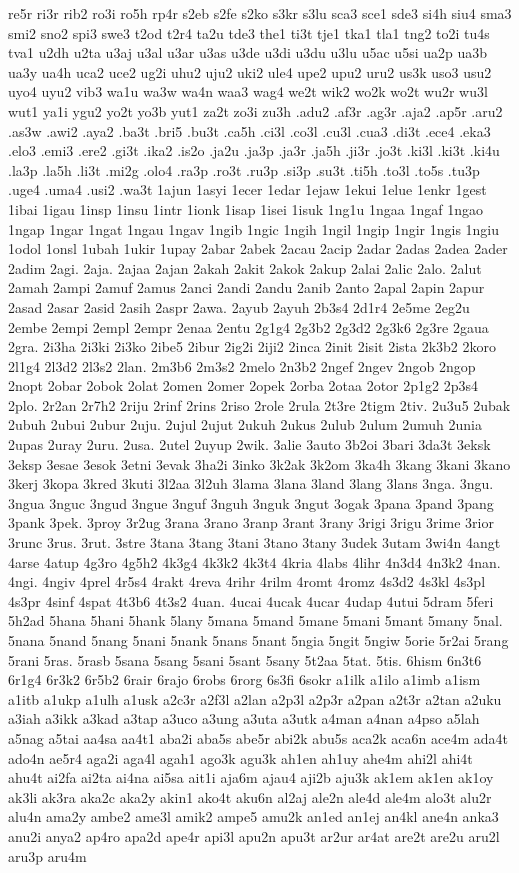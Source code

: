 {re5r ri3r rib2 ro3i ro5h rp4r s2eb s2fe s2ko s3kr s3lu sca3 sce1 sde3 si4h siu4 sma3 smi2 sno2 spi3 swe3 t2od t2r4 ta2u tde3 the1 ti3t tje1 tka1 tla1 tng2 to2i tu4s tva1 u2dh u2ta u3aj u3al u3ar u3as u3de u3di u3du u3lu u5ac u5si ua2p ua3b ua3y ua4h uca2 uce2 ug2i uhu2 uju2 uki2 ule4 upe2 upu2 uru2 us3k uso3 usu2 uyo4 uyu2 vib3 wa1u wa3w wa4n waa3 wag4 we2t wik2 wo2k wo2t wu2r wu3l wut1 ya1i ygu2 yo2t yo3b yut1 za2t zo3i zu3h
.adu2 .af3r .ag3r .aja2 .ap5r .aru2 .as3w .awi2 .aya2 .ba3t .bri5 .bu3t .ca5h .ci3l .co3l .cu3l .cua3 .di3t .ece4 .eka3 .elo3 .emi3 .ere2 .gi3t .ika2 .is2o .ja2u .ja3p .ja3r .ja5h .ji3r .jo3t .ki3l .ki3t .ki4u .la3p .la5h .li3t .mi2g .olo4 .ra3p .ro3t .ru3p .si3p .su3t .ti5h .to3l .to5s .tu3p .uge4 .uma4 .usi2 .wa3t 1ajun 1asyi 1ecer 1edar 1ejaw 1ekui 1elue 1enkr 1gest 1ibai 1igau 1insp 1insu 1intr 1ionk 1isap 1isei 1isuk 1ng1u 1ngaa 1ngaf 1ngao 1ngap 1ngar 1ngat 1ngau 1ngav 1ngib 1ngic 1ngih 1ngil 1ngip 1ngir 1ngis 1ngiu 1odol 1onsl 1ubah 1ukir 1upay 2abar 2abek 2acau 2acip 2adar 2adas 2adea 2ader 2adim 2agi. 2aja. 2ajaa 2ajan 2akah 2akit 2akok 2akup 2alai 2alic 2alo. 2alut 2amah 2ampi 2amuf 2amus 2anci 2andi 2andu 2anib 2anto 2apal 2apin 2apur 2asad 2asar 2asid 2asih 2aspr 2awa. 2ayub 2ayuh 2b3s4 2d1r4 2e5me 2eg2u 2embe 2empi 2empl 2empr 2enaa 2entu 2g1g4 2g3b2 2g3d2 2g3k6 2g3re 2gaua 2gra. 2i3ha 2i3ki 2i3ko 2ibe5 2ibur 2ig2i 2iji2 2inca 2init 2isit 2ista 2k3b2 2koro 2l1g4 2l3d2 2l3s2 2lan. 2m3b6 2m3s2 2melo 2n3b2 2ngef 2ngev 2ngob 2ngop 2nopt 2obar 2obok 2olat 2omen 2omer 2opek 2orba 2otaa 2otor 2p1g2 2p3s4 2plo. 2r2an 2r7h2 2riju 2rinf 2rins 2riso 2role 2rula 2t3re 2tigm 2tiv. 2u3u5 2ubak 2ubuh 2ubui 2ubur 2uju. 2ujul 2ujut 2ukuh 2ukus 2ulub 2ulum 2umuh 2unia 2upas 2uray 2uru. 2usa. 2utel 2uyup 2wik. 3alie 3auto 3b2oi 3bari 3da3t 3eksk 3eksp 3esae 3esok 3etni 3evak 3ha2i 3inko 3k2ak 3k2om 3ka4h 3kang 3kani 3kano 3kerj 3kopa 3kred 3kuti 3l2aa 3l2uh 3lama 3lana 3land 3lang 3lans 3nga. 3ngu. 3ngua 3nguc 3ngud 3ngue 3nguf 3nguh 3nguk 3ngut 3ogak 3pana 3pand 3pang 3pank 3pek. 3proy 3r2ug 3rana 3rano 3ranp 3rant 3rany 3rigi 3rigu 3rime 3rior 3runc 3rus. 3rut. 3stre 3tana 3tang 3tani 3tano 3tany 3udek 3utam 3wi4n 4angt 4arse 4atup 4g3ro 4g5h2 4k3g4 4k3k2 4k3t4 4kria 4labs 4lihr 4n3d4 4n3k2 4nan. 4ngi. 4ngiv 4prel 4r5s4 4rakt 4reva 4rihr 4rilm 4romt 4romz 4s3d2 4s3kl 4s3pl 4s3pr 4sinf 4spat 4t3b6 4t3s2 4uan. 4ucai 4ucak 4ucar 4udap 4utui 5dram 5feri 5h2ad 5hana 5hani 5hank 5lany 5mana 5mand 5mane 5mani 5mant 5many 5nal. 5nana 5nand 5nang 5nani 5nank 5nans 5nant 5ngia 5ngit 5ngiw 5orie 5r2ai 5rang 5rani 5ras. 5rasb 5sana 5sang 5sani 5sant 5sany 5t2aa 5tat. 5tis. 6hism 6n3t6 6r1g4 6r3k2 6r5b2 6rair 6rajo 6robs 6rorg 6s3fi 6sokr a1ilk a1ilo a1imb a1ism a1itb a1ukp a1ulh a1usk a2c3r a2f3l a2lan a2p3l a2p3r a2pan a2t3r a2tan a2uku a3iah a3ikk a3kad a3tap a3uco a3ung a3uta a3utk a4man a4nan a4pso a5lah a5nag a5tai aa4sa aa4t1 aba2i aba5s abe5r abi2k abu5s aca2k aca6n ace4m ada4t ado4n ae5r4 aga2i aga4l agah1 ago3k agu3k ah1en ah1uy ahe4m ahi2l ahi4t ahu4t ai2fa ai2ta ai4na ai5sa ait1i aja6m ajau4 aji2b aju3k ak1em ak1en ak1oy ak3li ak3ra aka2c aka2y akin1 ako4t aku6n al2aj ale2n ale4d ale4m alo3t alu2r alu4n ama2y ambe2 ame3l amik2 ampe5 amu2k an1ed an1ej an4kl ane4n anka3 anu2i anya2 ap4ro apa2d ape4r api3l apu2n apu3t ar2ur ar4at are2t are2u aru2l aru3p aru4m }
